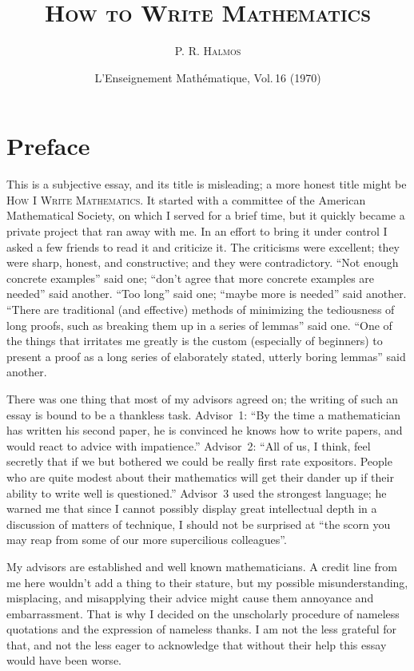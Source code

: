 \documentclass[12pt]{article}
\title{\textsc{How to Write Mathematics}}
\author{\textsc{P. R. Halmos}}
\date{L'Enseignement Mathématique, Vol.\,16 (1970)}
\begin{document}
\maketitle

\section{Preface}

This is a subjective essay, and its title is misleading; a more honest title might be \textsc{How I Write Mathematics}. It started with a committee of the American Mathematical Society, on which I served for a brief time, but it quickly became a private project that ran away with me. In an effort to bring it under control I asked a few friends to read it and criticize it. The criticisms were excellent; they were sharp, honest, and constructive; and they were contradictory. ``Not enough concrete examples'' said one; ``don't agree that more concrete examples are needed'' said another. ``Too long'' said one; ``maybe more is needed'' said another. ``There are traditional (and effective) methods of minimizing the tediousness of long proofs, such as breaking them up in a series of lemmas'' said one. ``One of the things that irritates me greatly is the custom (especially of beginners) to present a proof as a long series of elaborately stated, utterly boring lemmas'' said another. 

There was one thing that most of my advisors agreed on; the writing of such an essay is bound to be a thankless task. Advisor~1: ``By the time a mathematician has written his second paper, he is convinced he knows how to write papers, and would react to advice with impatience.'' Advisor~2: ``All of us, I think, feel secretly that if we but bothered we could be really first rate expositors. People who are quite modest about their mathematics will get their dander up if their ability to write well is questioned.'' Advisor~3 used the strongest language; he warned me that since I cannot possibly display great intellectual depth in a discussion of matters of technique, I should not be surprised at ``the scorn you may reap from some of our more supercilious colleagues''. 

My advisors are established and well known mathematicians. A credit line from me here wouldn't add a thing to their stature, but my possible misunderstanding, misplacing, and misapplying their advice might cause them annoyance and embarrassment. That is why I decided on the unscholarly procedure of nameless quotations and the expression of nameless thanks. I am not the less grateful for that, and not the less eager to acknowledge that without their help this essay would have been worse. 
\end{document}

